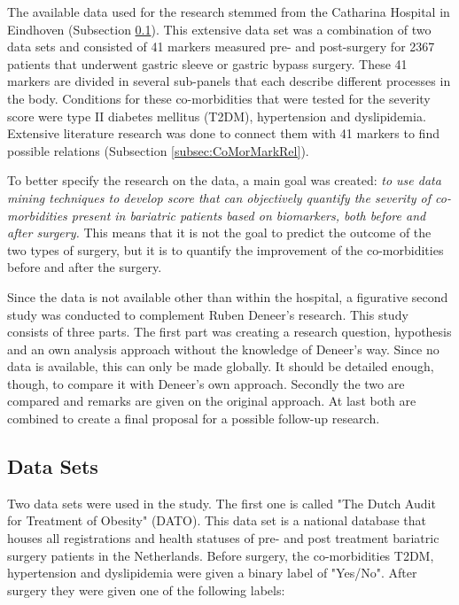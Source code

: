 \documentclass[10pt,a4paper]{article}
\begin{document}
	The available data used for the research stemmed from the Catharina Hospital in Eindhoven (Subsection \ref{subsec:DataSets}). This extensive data set was a combination of two data sets and consisted of 41 markers measured pre- and post-surgery for 2367 patients that underwent gastric sleeve or gastric bypass surgery. These 41 markers are divided in several sub-panels that each describe different processes in the body. Conditions for these co-morbidities that were tested for the severity score were type II diabetes mellitus (T2DM), hypertension and dyslipidemia. Extensive literature research was done to connect them with 41 markers to find possible relations (Subsection \ref{subsec:CoMorMarkRel}). \cite{Deneer2017Thesis}

	To better specify the research on the data, a main goal was created: \emph{to use data mining techniques to develop score that can objectively quantify the severity of co-morbidities present in bariatric patients based on biomarkers, both before and after surgery.} This means that it is not the goal to predict the outcome of the two types of surgery, but it is to quantify the improvement of the co-morbidities before and after the surgery. \cite{Deneer2017Thesis}

	Since the data is not available other than within the hospital, a figurative second study was conducted to complement Ruben Deneer's research. This study consists of three parts. The first part was creating a research question, hypothesis and an own analysis approach without the knowledge of Deneer's way. Since no data is available, this can only be made globally. It should be detailed enough, though, to compare it with Deneer's own approach. Secondly the two are compared and remarks are given on the original approach. At last both are combined to create a final proposal for a possible follow-up research. 
	
	\subsection{Data Sets}
	\label{subsec:DataSets}
	
	Two data sets were used in the study. The first one is called "The Dutch Audit for Treatment of Obesity" (DATO). This data set is a national database that houses all registrations and health statuses of pre- and post treatment bariatric surgery patients in the Netherlands. Before surgery, the co-morbidities T2DM, hypertension and dyslipidemia were given a binary label of "Yes/No". After surgery they were given one of the following labels:
	
\end{document}
